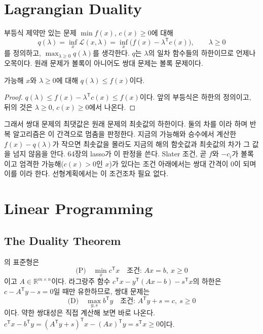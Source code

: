 \section{Lagrangian Duality}
\label{sec:lagrange-duality}

부등식 제약만 있는 문제 $\min f(x)$, $c(x)\ge0$에 대해 
\[
q(\lambda)=\inf_x\mathcal L(x,\lambda)=\inf_x\bigl(f(x)-\lambda^{\mathsf T}c(x)\bigr),\qquad\lambda\ge0
\]
를 정의하고,  $\max_{\lambda\ge0}q(\lambda)$를 생각한다. $q$는 $\lambda$의 일차 함수들의 하한이므로 언제나 오목이다. 원래 문제가 볼록이 아니어도 쌍대 문제는 볼록 문제이다.

\begin{proposition}[약한 쌍대성]
가능해 $x$와 $\lambda\ge0$에 대해 $q(\lambda)\le f(x)$이다.
\end{proposition}

\begin{proof}
$q(\lambda)\le f(x)-\lambda^{\mathsf T}c(x)\le f(x)$이다. 앞의 부등식은 하한의 정의이고, 뒤의 것은 $\lambda\ge0$, $c(x)\ge0$에서 나온다.
\end{proof}

그래서 쌍대 문제의 최댓값은 원래 문제의 최솟값의 하한이다. 둘의 차를 이라 하며 반복 알고리즘은 이 간격으로 멈춤을 판정한다. 지금의 가능해와 승수에서 계산한 $f(x)-q(\lambda)$가 작으면 최솟값을 몰라도 지금의 해의 함숫값과 최솟값의 차가 그 값을 넘지 않음을 안다. 64장의 lasso가 이 판정을 쓴다. Slater 조건, 곧 $f$와 $-c_i$가 볼록이고 엄격한 가능해($c(x)>0$인 $x$)가 있다는 조건 아래에서는 쌍대 간격이 $0$이 되며 이를 이라 한다\cite{boyd2004convex}. 선형계획에서는 이 조건조차 필요 없다.

\section{Linear Programming}
\label{sec:linear-programming}

\subsection{The Duality Theorem}

의 표준형은
\[
\text{(P)}\quad\min_xc^{\mathsf T}x\quad\text{조건: }Ax=b,\ x\ge0
\]
이고 $A\in\mathbb R^{m\times n}$이다. 라그랑주 함수 $c^{\mathsf T}x-y^{\mathsf T}(Ax-b)-s^{\mathsf T}x$의 하한은 $c-A^{\mathsf T}y-s=0$일 때만 유한하므로, 쌍대 문제는
\[
\text{(D)}\quad\max_{y,s}b^{\mathsf T}y\quad\text{조건: }A^{\mathsf T}y+s=c,\ s\ge0
\]
이다. 약한 쌍대성은 직접 계산해 보면 바로 나온다. $c^{\mathsf T}x-b^{\mathsf T}y=(A^{\mathsf T}y+s)^{\mathsf T}x-(Ax)^{\mathsf T}y=s^{\mathsf T}x\ge0$이다.

